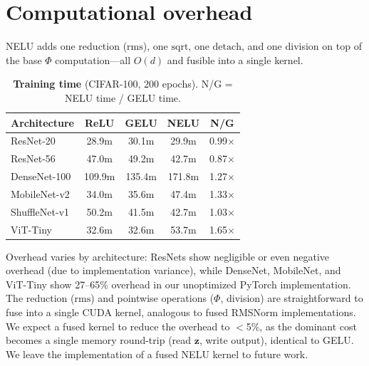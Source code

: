 \section{Computational overhead}\label{app:overhead}

NELU adds one reduction ($\mathrm{rms}$), one $\mathrm{sqrt}$, one $\mathrm{detach}$, and one division on top of the base $\Phi$ computation---all $O(d)$ and fusible into a single kernel.

\begin{table}[h]
\centering
\caption{\textbf{Training time} (CIFAR-100, 200 epochs). N/G = NELU time / GELU time.}
\label{tab:overhead}
\vspace{0.5em}
\small
\begin{tabular}{lcccc}
\toprule
Architecture & ReLU & GELU & NELU & N/G \\
\midrule
ResNet-20    & 28.9m  & 30.1m  & 29.9m  & 0.99$\times$ \\
ResNet-56    & 47.0m  & 49.2m  & 42.7m  & 0.87$\times$ \\
DenseNet-100 & 109.9m & 135.4m & 171.8m & 1.27$\times$ \\
MobileNet-v2 & 34.0m  & 35.6m  & 47.4m  & 1.33$\times$ \\
ShuffleNet-v1 & 50.2m & 41.5m  & 42.7m  & 1.03$\times$ \\
ViT-Tiny     & 32.6m  & 32.6m  & 53.7m  & 1.65$\times$ \\
\bottomrule
\end{tabular}
\end{table}

Overhead varies by architecture: ResNets show negligible or even negative overhead (due to implementation variance), while DenseNet, MobileNet, and ViT-Tiny show 27--65\% overhead in our unoptimized PyTorch implementation.
The reduction ($\mathrm{rms}$) and pointwise operations ($\Phi$, division) are straightforward to fuse into a single CUDA kernel, analogous to fused RMSNorm implementations.
We expect a fused kernel to reduce the overhead to $<$5\%, as the dominant cost becomes a single memory round-trip (read $\mathbf{z}$, write output), identical to GELU.
We leave the implementation of a fused NELU kernel to future work.